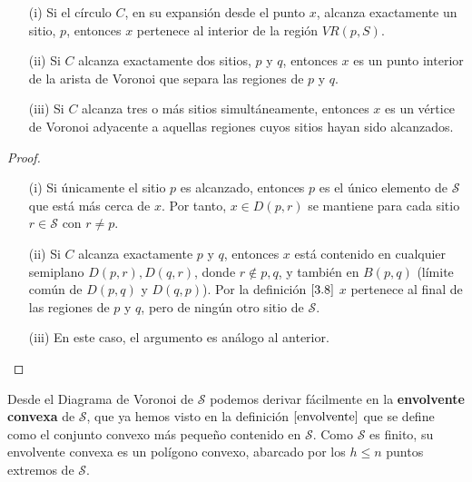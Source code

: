 \begin{lema} 
    \begin{enumerate}
    	\item [(i)] Si el círculo $C$, en su expansión desde el punto $x$, alcanza exactamente un sitio, $p$, entonces $x$ pertenece al interior de la región $VR(p,S)$. 
    	\item [(ii)] Si $C$ alcanza exactamente dos sitios, $p$ y $q$, entonces $x$ es un punto interior de la arista de Voronoi que separa las regiones de $p$ y $q$. 
    	\item [(iii)] Si $C$ alcanza tres o más sitios simultáneamente, entonces $x$ es un vértice de Voronoi adyacente a aquellas regiones cuyos sitios hayan sido alcanzados.
    \end{enumerate}


	 \begin{proof} 
		\begin{enumerate}
			\item [(i)] Si únicamente el sitio $p$ es alcanzado, entonces $p$ es el único elemento de $\mathcal{S}$ que está más cerca de $x$. Por tanto, $x \in D(p,r)$ se mantiene para cada sitio $r \in \mathcal{S}$ con $r \neq p$. 
			\item [(ii)] Si $C$ alcanza exactamente $p$ y $q$, entonces $x$ está contenido en cualquier semiplano $D(p,r), D(q,r)$, donde $r \notin {p,q}$, y también en $B(p,q)$ (límite común de $D(p,q)$ y $D(q,p)$). Por la definición $\ref{3.8}$ $x$ pertenece al final de las regiones de $p$ y $q$, pero de ningún otro sitio de $\mathcal{S}$. 
			\item [(iii)] En este caso, el argumento es análogo al anterior. 
		\end{enumerate}
		
	\end{proof}
\end{lema}

Desde el Diagrama de Voronoi de $\mathcal{S}$ podemos derivar fácilmente en la \textbf{envolvente convexa} de $\mathcal{S}$, que ya hemos visto en la definición $\ref{envolvente}$ que se define como el conjunto convexo más pequeño contenido en $\mathcal{S}$. Como $\mathcal{S}$ es finito, su envolvente convexa es un polígono convexo, abarcado por los $h \leq n$ puntos extremos de $\mathcal{S}$.

